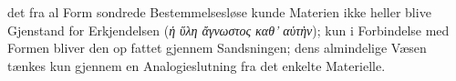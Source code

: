 \documentclass[12pt,a4paper]{book}
\newcommand{\gk}[1]{\textit{#1}}
\begin{document}
det fra al Form sondrede Bestemmelsesløse kunde Materien
ikke heller blive Gjenstand for Erkjendelsen (\gk{ἡ ὕλη ἄγνωστος
καθ' αὑτὴν}); kun i Forbindelse med Formen bliver den op\-%
fattet gjennem Sandsningen; dens almindelige Væsen tænkes
kun gjennem en Analogieslutning fra det enkelte Materielle.
\end{document}
